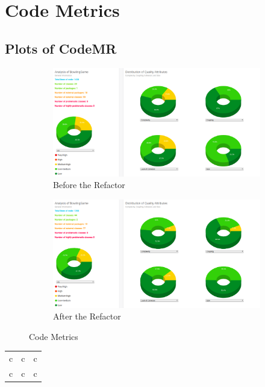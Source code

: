 
\section{Code Metrics}

\subsection{Plots of CodeMR}

\begin{figure}[H]
    \centering
    \begin{subfigure}{\textwidth}
        \includegraphics[width = \textwidth]{img/stats_pre.png}
        \caption{Before the Refactor}
    \end{subfigure}
    \begin{subfigure}{\textwidth}
        \includegraphics[width = \textwidth]{img/stats_post.png}
        \caption{After the Refactor}
    \end{subfigure}
    \caption{Code Metrics}
\end{figure}

\begin{tabular}{ |c|c|c| }
    \hline
    c & c & c \\
    c & c & c \\
    \hline
\end{tabular}